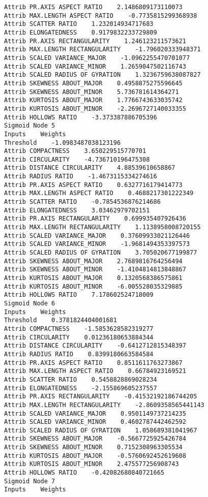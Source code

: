 \documentclass[
	article,			%
	11pt,				%
	oneside,			%
	a4paper,			%
	english,			%
	brazil,				%
	sumario=tradicional
	]{abntex2}
\begin{document}
\begin{lstlisting}
Attrib PR.AXIS ASPECT RATIO    2.1486809173110073
Attrib MAX.LENGTH ASPECT RATIO    -0.7735815299368938
Attrib SCATTER RATIO    1.232014934717683
Attrib ELONGATEDNESS    0.9179832233729809
Attrib PR.AXIS RECTANGULARITY    1.246123211573621
Attrib MAX.LENGTH RECTANGULARITY    -1.796020333948371
Attrib SCALED VARIANCE_MAJOR    -1.0962255470701077
Attrib SCALED VARIANCE_MINOR    1.2659047502116743
Attrib SCALED RADIUS OF GYRATION    1.3236759638087827
Attrib SKEWNESS ABOUT_MAJOR    0.4958875275596645
Attrib SKEWNESS ABOUT_MINOR    5.736781614364271
Attrib KURTOSIS ABOUT_MAJOR    1.7766743633035742
Attrib KURTOSIS ABOUT_MINOR    -2.2696727140033355
Attrib HOLLOWS RATIO    -3.373387886705396
Sigmoid Node 5
Inputs    Weights
Threshold    -1.0983487038123196
Attrib COMPACTNESS    3.650229515770701
Attrib CIRCULARITY    -4.736710196475308
Attrib DISTANCE CIRCULARITY    4.88539610658867
Attrib RADIUS RATIO    -1.4673115334274616
Attrib PR.AXIS ASPECT RATIO    0.6327716179414773
Attrib MAX.LENGTH ASPECT RATIO    0.4688217301222349
Attrib SCATTER RATIO    -0.7854536876214686
Attrib ELONGATEDNESS    3.03462979702151
Attrib PR.AXIS RECTANGULARITY    0.699935407926436
Attrib MAX.LENGTH RECTANGULARITY    1.1138958008720155
Attrib SCALED VARIANCE_MAJOR    0.37609933021126446
Attrib SCALED VARIANCE_MINOR    -1.9681494353397573
Attrib SCALED RADIUS OF GYRATION    3.705020677199877
Attrib SKEWNESS ABOUT_MAJOR    2.7689816764256494
Attrib SKEWNESS ABOUT_MINOR    -1.4104814813848867
Attrib KURTOSIS ABOUT_MAJOR    0.1320568386575861
Attrib KURTOSIS ABOUT_MINOR    -6.005528035329885
Attrib HOLLOWS RATIO    7.178602524718009
Sigmoid Node 6
Inputs    Weights
Threshold    0.3781824404001681
Attrib COMPACTNESS    -1.5853628582319277
Attrib CIRCULARITY    0.01236180653884344
Attrib DISTANCE CIRCULARITY    -0.6412712815348397
Attrib RADIUS RATIO    0.8399180663584584
Attrib PR.AXIS ASPECT RATIO    0.8511611763273867
Attrib MAX.LENGTH ASPECT RATIO    0.66784923169521
Attrib SCATTER RATIO    0.5458828869028234
Attrib ELONGATEDNESS    -2.155869605237557
Attrib PR.AXIS RECTANGULARITY    -0.41532192186744205
Attrib MAX.LENGTH RECTANGULARITY    -2.8609358565441143
Attrib SCALED VARIANCE_MAJOR    0.9501149737214235
Attrib SCALED VARIANCE_MINOR    0.4602787442462592
Attrib SCALED RADIUS OF GYRATION    1.058689381041967
Attrib SKEWNESS ABOUT_MAJOR    -0.5667725925426784
Attrib SKEWNESS ABOUT_MINOR    0.7152308963305534
Attrib KURTOSIS ABOUT_MAJOR    -0.5760692452619608
Attrib KURTOSIS ABOUT_MINOR    2.475577256908743
Attrib HOLLOWS RATIO    -0.42082680840721665
Sigmoid Node 7
Inputs    Weights

\end{lstlisting}
\end{document}
